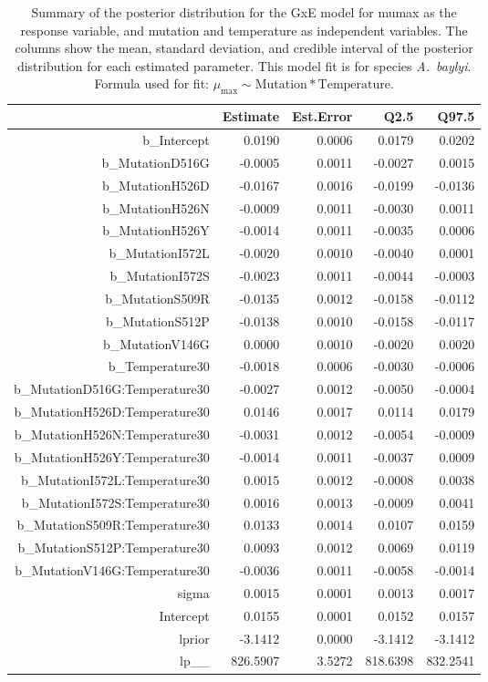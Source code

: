 \begin{table}[ht]
\centering
\begin{tabular}{rrrrr}
  \hline
 & Estimate & Est.Error & Q2.5 & Q97.5 \\ 
  \hline
b\_Intercept & 0.0190 & 0.0006 & 0.0179 & 0.0202 \\ 
  b\_MutationD516G & -0.0005 & 0.0011 & -0.0027 & 0.0015 \\ 
  b\_MutationH526D & -0.0167 & 0.0016 & -0.0199 & -0.0136 \\ 
  b\_MutationH526N & -0.0009 & 0.0011 & -0.0030 & 0.0011 \\ 
  b\_MutationH526Y & -0.0014 & 0.0011 & -0.0035 & 0.0006 \\ 
  b\_MutationI572L & -0.0020 & 0.0010 & -0.0040 & 0.0001 \\ 
  b\_MutationI572S & -0.0023 & 0.0011 & -0.0044 & -0.0003 \\ 
  b\_MutationS509R & -0.0135 & 0.0012 & -0.0158 & -0.0112 \\ 
  b\_MutationS512P & -0.0138 & 0.0010 & -0.0158 & -0.0117 \\ 
  b\_MutationV146G & 0.0000 & 0.0010 & -0.0020 & 0.0020 \\ 
  b\_Temperature30 & -0.0018 & 0.0006 & -0.0030 & -0.0006 \\ 
  b\_MutationD516G:Temperature30 & -0.0027 & 0.0012 & -0.0050 & -0.0004 \\ 
  b\_MutationH526D:Temperature30 & 0.0146 & 0.0017 & 0.0114 & 0.0179 \\ 
  b\_MutationH526N:Temperature30 & -0.0031 & 0.0012 & -0.0054 & -0.0009 \\ 
  b\_MutationH526Y:Temperature30 & -0.0014 & 0.0011 & -0.0037 & 0.0009 \\ 
  b\_MutationI572L:Temperature30 & 0.0015 & 0.0012 & -0.0008 & 0.0038 \\ 
  b\_MutationI572S:Temperature30 & 0.0016 & 0.0013 & -0.0009 & 0.0041 \\ 
  b\_MutationS509R:Temperature30 & 0.0133 & 0.0014 & 0.0107 & 0.0159 \\ 
  b\_MutationS512P:Temperature30 & 0.0093 & 0.0012 & 0.0069 & 0.0119 \\ 
  b\_MutationV146G:Temperature30 & -0.0036 & 0.0011 & -0.0058 & -0.0014 \\ 
  sigma & 0.0015 & 0.0001 & 0.0013 & 0.0017 \\ 
  Intercept & 0.0155 & 0.0001 & 0.0152 & 0.0157 \\ 
  lprior & -3.1412 & 0.0000 & -3.1412 & -3.1412 \\ 
  lp\_\_ & 826.5907 & 3.5272 & 818.6398 & 832.2541 \\ 
   \hline
\end{tabular}
\caption{Summary of the posterior distribution for the GxE model for mumax as the response variable, and mutation and temperature as independent variables. The columns show the mean, standard deviation, and credible interval of the posterior distribution for each estimated parameter. This model fit is for species \textit{A.~baylyi}.  Formula used for fit: $\mu_{\text{max}} \sim \text{Mutation} * \text{Temperature}$.} 
\label{supptab:GxE_mumax_Abaylyi}
\end{table}



